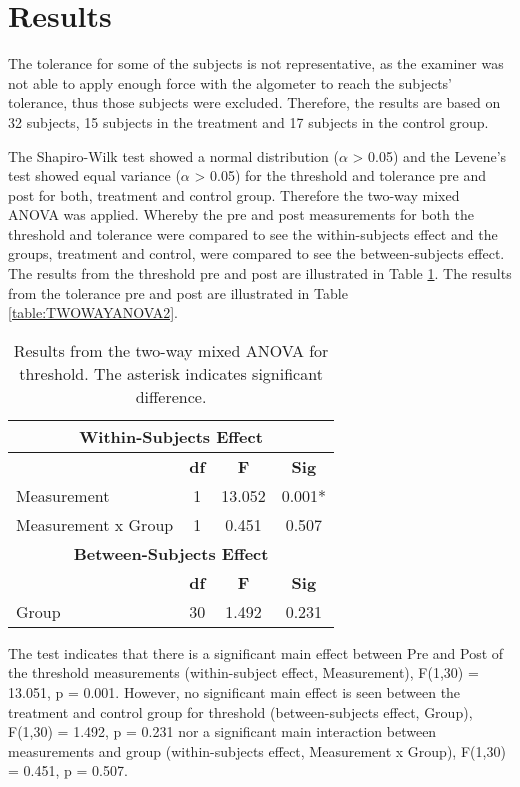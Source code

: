 \section{Results}
The tolerance for some of the subjects is not representative, as the examiner was not able to apply enough force with the algometer to reach the subjects' tolerance, thus those subjects were excluded. Therefore,
the results are based on 32 subjects, 15 subjects in the treatment and 17 subjects in the control group. 

The Shapiro-Wilk test showed a normal distribution ($\alpha$ > 0.05) and the Levene's test showed equal variance ($\alpha$ > 0.05) for the threshold and tolerance pre and post for both, treatment and control group. Therefore the two-way mixed ANOVA was applied. Whereby the pre and post measurements for both the threshold and tolerance were compared to see the within-subjects effect and the groups, treatment and control, were compared to see the between-subjects effect. The results from the threshold pre and post are illustrated in Table \ref{table:TWOWAYANOVA1}.   The results from the tolerance pre and post are illustrated in Table \ref{table:TWOWAYANOVA2}. 

\begin{table}[ht]
\caption{Results from the two-way mixed ANOVA for threshold. The asterisk indicates significant difference.}
\centering
\begin{tabular}{l c c c}
\toprule
\multicolumn{4}{c}{\textbf{Within-Subjects Effect}} \\
\midrule
& \textbf{df} &\textbf{F} & \textbf{Sig} \\ [0.5ex] %
Measurement & 1 & 13.052 &  0.001* \\
Measurement x Group & 1 & 0.451 & 0.507 \\
\toprule
\multicolumn{4}{c}{\textbf{Between-Subjects Effect}} \\
\midrule 
& \textbf{df} & \textbf{F} & \textbf{Sig} \\ [0.5ex] %
Group & 30 & 1.492 &  0.231 \\
\hline
\end{tabular}
\label{table:TWOWAYANOVA1}
\end{table}

\noindent
The test indicates that there is a significant main effect between Pre and Post of the threshold measurements (within-subject effect, Measurement), F(1,30) = 13.051, p = 0.001. However, no significant main effect is seen between the treatment and control group for threshold (between-subjects effect, Group), F(1,30) = 1.492, p = 0.231 nor a significant main interaction between measurements and group (within-subjects effect, Measurement x Group), F(1,30) = 0.451, p = 0.507. 

